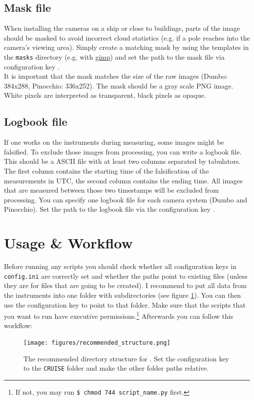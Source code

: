 \documentclass[11pt,a4paper]{article}
\begin{document}
\subsection{Mask file}
When installing the cameras on a ship or close to buildings, parts of the image should be masked to avoid incorrect cloud statistics (e.g. if a pole reaches into the camera's viewing area). Simply create a matching mask by using the templates in the \texttt{masks} directory (e.g. with \href{https://www.gimp.org}{gimp}) and set the path to the mask file via configuration key .\\
It is important that the mask matches the size of the raw images (Dumbo: 384x288, Pinocchio: 336x252). The mask should be a gray scale PNG image. White pixels are interpreted as transparent, black pixels as opaque.

\subsection{Logbook file}
If one works on the instruments during measuring, some images might be falsified. To exclude those images from processing, you can write a logbook file. This should be a ASCII file with at least two columns separated by tabulators. The first column contains the starting time of the falsification of the measurements in UTC, the second column contains the ending time. All images that are measured between those two timestamps will be excluded from processing. You can specify one logbook file for each camera system (Dumbo and Pinocchio). Set the path to the logbook file via the configuration key .\\

\section{Usage \& Workflow}
\label{sec:usage-workflow}
Before running any scripts you should check whether all configuration keys in \texttt{config.ini} are correctly set and whether the paths point to existing files (unless they are for files that are going to be created). I recommend to put all data from the instruments into one folder with subdirectories (see figure \ref{fig:directory-structure}). You can then use the configuration key  to point to that folder. Make sure that the scripts that you want to run have executive permissions.\footnote{If not, you may run \texttt{\$ chmod 744 script\_name.py} first.} Afterwards you can follow this workflow:
\begin{figure}
	\centering
  	\texttt{[image: figures/recommended\_structure.png]}
  	\caption{The recommended directory structure for \cloud. Set the  configuration key to the \texttt{CRUISE} folder and make the other folder paths relative.}
  	\label{fig:directory-structure}
\end{figure}
\end{document}
